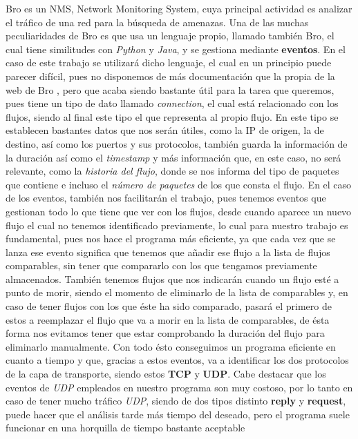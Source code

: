 Bro es un NMS, Network Monitoring System, cuya principal actividad 
es analizar el tráfico de una red para la búsqueda de amenazas. Una de 
las muchas peculiaridades de Bro es que usa un lenguaje propio, llamado 
también Bro, el cual tiene similitudes con \textit{Python} y \textit{Java}, y se gestiona 
mediante \textbf{eventos}. En el caso de este trabajo se utilizará dicho lenguaje, 
el cual en un principio puede parecer difícil, pues no disponemos de más 
documentación que la propia de la web de Bro \cite{broindex}, pero que acaba siendo 
bastante útil para la tarea que queremos, pues tiene un tipo de dato 
llamado \textit{connection}, el cual está relacionado con los flujos, siendo al 
final este tipo el que representa al propio flujo. En este tipo se establecen bastantes 
datos que nos serán útiles, como la IP de origen, la de destino, así 
como los puertos y sus protocolos, también guarda la información de la 
duración así como el \textit{timestamp} y más información que, en este caso, no 
será relevante, como la \textit{historia del flujo}, donde se nos informa del 
tipo de paquetes que contiene e incluso el \textit{número de paquetes} de los que consta el flujo.
\intro
En el caso de los eventos, también nos facilitarán el trabajo, pues tenemos 
eventos que gestionan todo lo que tiene que ver con los flujos, desde 
cuando aparece un nuevo flujo el cual no tenemos identificado previamente, 
lo cual para nuestro trabajo es fundamental, pues nos hace el programa más 
eficiente, ya que cada vez que se lanza ese evento significa que tenemos 
que añadir ese flujo a la lista de flujos comparables, sin tener que 
compararlo con los que tengamos previamente almacenados. También tenemos 
flujos que nos indicarán cuando un flujo esté a punto de morir, siendo el 
momento de eliminarlo de la lista de comparables y, en caso de tener 
flujos con los que éste ha sido comparado, pasará el primero de estos a 
reemplazar el flujo que va a morir en la lista de comparables, de ésta 
forma nos evitamos tener que estar comprobando la duración del flujo 
para eliminarlo manualmente. Con todo ésto conseguimos un programa eficiente 
en cuanto a tiempo y que, gracias a estos eventos, va a identificar los dos 
protocolos de la capa de transporte, siendo estos \textbf{TCP} y \textbf{UDP}. Cabe destacar que los 
eventos de \textit{UDP} empleados en nuestro programa son muy costoso, por lo tanto 
en caso de tener mucho tráfico \textit{UDP}, siendo de dos tipos distinto \textbf{reply} y 
\textbf{request}, puede hacer que el análisis tarde más tiempo del deseado, pero 
el programa suele funcionar en una horquilla de tiempo bastante aceptable 

